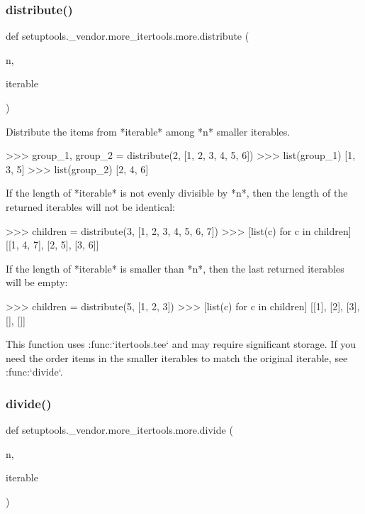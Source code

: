 \subsubsection{\texorpdfstring{distribute()}{distribute()}}
{\footnotesize\ttfamily def setuptools.\+\_\+vendor.\+more\+\_\+itertools.\+more.\+distribute (\begin{DoxyParamCaption}\item[{}]{n,  }\item[{}]{iterable }\end{DoxyParamCaption})}

\begin{DoxyVerb}Distribute the items from *iterable* among *n* smaller iterables.

    >>> group_1, group_2 = distribute(2, [1, 2, 3, 4, 5, 6])
    >>> list(group_1)
    [1, 3, 5]
    >>> list(group_2)
    [2, 4, 6]

If the length of *iterable* is not evenly divisible by *n*, then the
length of the returned iterables will not be identical:

    >>> children = distribute(3, [1, 2, 3, 4, 5, 6, 7])
    >>> [list(c) for c in children]
    [[1, 4, 7], [2, 5], [3, 6]]

If the length of *iterable* is smaller than *n*, then the last returned
iterables will be empty:

    >>> children = distribute(5, [1, 2, 3])
    >>> [list(c) for c in children]
    [[1], [2], [3], [], []]

This function uses :func:`itertools.tee` and may require significant
storage. If you need the order items in the smaller iterables to match the
original iterable, see :func:`divide`.\end{DoxyVerb}
 \mbox{\label{namespacesetuptools_1_1__vendor_1_1more__itertools_1_1more_a18f0983503e4bb346c7d1e1fb9d929fc}} 
\subsubsection{\texorpdfstring{divide()}{divide()}}
{\footnotesize\ttfamily def setuptools.\+\_\+vendor.\+more\+\_\+itertools.\+more.\+divide (\begin{DoxyParamCaption}\item[{}]{n,  }\item[{}]{iterable }\end{DoxyParamCaption})}

